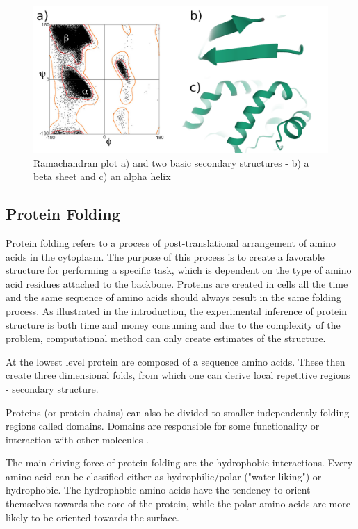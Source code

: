 \begin{figure}
    \centering
    \includegraphics[width=\linewidth]{imgs_tomas/secondary.png}
    \caption{Ramachandran plot \cite{ramachandran} a) and two basic secondary structures - b) a beta sheet and c) an alpha helix \cite{pdb}}
    \label{fig:ramachandran}
\end{figure}

\subsection{Protein Folding}

Protein folding refers to a process of post-translational arrangement of amino acids in the cytoplasm. The purpose of this process is to create a favorable structure for performing a specific task, which is dependent on the type of amino acid residues attached to the backbone. Proteins are created in cells all the time and the same sequence of amino acids should always result in the same folding process. As illustrated in the introduction, the experimental inference of protein structure is both time and money consuming and due to the complexity of the problem, computational method can only create estimates of the structure.

At the lowest level protein are composed of a sequence amino acids. These then create three dimensional folds, from which one can derive local repetitive regions - secondary structure. 

Proteins (or protein chains) can also be divided to smaller independently folding regions called domains. Domains are responsible for some functionality or interaction with other molecules \cite{domains}.

The main driving force of protein folding are the hydrophobic interactions. Every amino acid can be classified either as hydrophilic/polar ("water liking") or hydrophobic. The hydrophobic amino acids have the tendency to orient themselves towards the core of the protein, while the polar amino acids are more likely to be oriented towards the surface.

